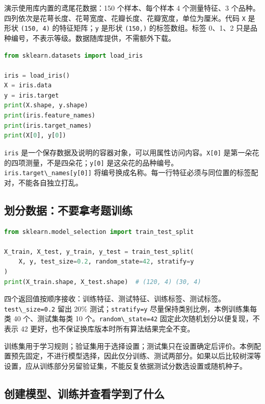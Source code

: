 \documentclass[UTF8,a4paper,11pt,fontset=fandol]{ctexart}
\providecommand{\passthrough}[1]{#1}
\begin{document}
演示使用库内置的鸢尾花数据：150 个样本、每个样本 4 个测量特征、3 个品种。四列依次是花萼长度、花萼宽度、花瓣长度、花瓣宽度，单位为厘米。代码 \passthrough{\lstinline!X!} 是形状 \passthrough{\lstinline!(150, 4)!} 的特征矩阵；\passthrough{\lstinline!y!} 是形状 \passthrough{\lstinline!(150,)!} 的标签数组。标签 0、1、2 只是品种编号，不表示等级。数据随库提供，不需额外下载。

\begin{lstlisting}[language=Python]
from sklearn.datasets import load_iris

iris = load_iris()
X = iris.data
y = iris.target
print(X.shape, y.shape)
print(iris.feature_names)
print(iris.target_names)
print(X[0], y[0])
\end{lstlisting}

\passthrough{\lstinline!iris!} 是一个保存数据及说明的容器对象，可以用属性访问内容。\passthrough{\lstinline!X[0]!} 是第一朵花的四项测量，不是四朵花；\passthrough{\lstinline!y[0]!} 是这朵花的品种编号。\passthrough{\lstinline!iris.target\_names[y[0]]!} 将编号换成名称。每一行特征必须与同位置的标签配对，不能各自独立打乱。

\clearpage

\subsection{划分数据：不要拿考题训练}\label{ux5212ux5206ux6570ux636eux4e0dux8981ux62ffux8003ux9898ux8badux7ec3}

\begin{lstlisting}[language=Python]
from sklearn.model_selection import train_test_split

X_train, X_test, y_train, y_test = train_test_split(
    X, y, test_size=0.2, random_state=42, stratify=y
)
print(X_train.shape, X_test.shape)  # (120, 4) (30, 4)
\end{lstlisting}

四个返回值按顺序接收：训练特征、测试特征、训练标签、测试标签。\passthrough{\lstinline!test\_size=0.2!} 留出 20\% 测试；\passthrough{\lstinline!stratify=y!} 尽量保持类别比例，本例训练集每类 40 个、测试集每类 10 个。\passthrough{\lstinline!random\_state=42!} 固定此次随机划分以便复现，不表示 42 更好，也不保证换库版本时所有算法结果完全不变。

训练集用于学习规则；验证集用于选择设置；测试集只在设置确定后评价。本例配置预先固定，不进行模型选择，因此仅分训练、测试两部分。如果以后比较树深等设置，应从训练部分另留验证集，不能反复依据测试分数选设置或随机种子。

\subsection{创建模型、训练并查看学到了什么}\label{ux521bux5efaux6a21ux578bux8badux7ec3ux5e76ux67e5ux770bux5b66ux5230ux4e86ux4ec0ux4e48}
\end{document}
